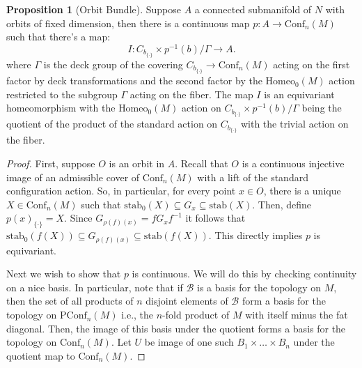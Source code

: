 \documentclass[10pt, oneside]{article}
\newcommand{\homeo}[1][S^1]{\text{Homeo}_0(#1)}
\newcommand{\conf}[2][S^1]{\text{Conf}_{#2}(#1)}
\newcommand{\pconf}[2][S^1]{\text{PConf}_{#2}(#1)}
\newcommand{\set}{{\{\cdot\}}}
\theoremstyle{definition}
\newtheorem{prop}{Proposition}[section]
\theoremstyle{definition}
\begin{document}
\begin{prop}[Orbit Bundle]
    Suppose $A$ a connected submanifold of $N$ 
    with orbits of fixed dimension, 
    then there is a continuous map $p: A\to \conf[M]{n}$ 
    such that there's a map: $$I: C_{b_\set} \times p^{-1}(b)/ \Gamma \to A.$$
    where $\Gamma$ is the deck group of the covering $C_{b_\set} \to \conf[M]{n}$ 
    acting on the first factor by deck transformations 
    and the second factor by the $\homeo[M]$ action 
    restricted to the subgroup $\Gamma$ acting on the fiber.
    The map $I$ is an equivariant homeomorphism 
    with the $\homeo[M]$ action on $C_{b_\set} \times p^{-1}(b) / \Gamma$ being the quotient of the product of the standard action on $C_{b_\set}$ 
    with the trivial action on the fiber.
\end{prop}
\begin{proof}
    First, 
    suppose $O$ is an orbit in $A$. 
    Recall that $O$ is a continuous injective image 
    of an admissible cover of $\conf[M]{n}$ 
    with a lift of the standard configuration action. 
    So, in particular, 
    for every point $x\in O$, 
    there is a unique $X\in\conf[M]{n}$ 
    such that $\text{stab}_0(X) \subseteq G_x \subseteq \text{stab}(X)$. 
    Then, define $p(x)_\set = X$. 
    Since $G_{\rho(f)(x)} = f G_x f^{-1}$ 
    it follows that $\text{stab}_0(f(X)) \subseteq G_{\rho(f)(x)}\subseteq \text{stab}(f(X))$. 
    This directly implies $p$ is equivariant. 

    Next we wish to show that $p$ is continuous.
    We will do this by checking continuity on a nice basis. 
    In particular, 
    note that if $\mathscr{B}$ is a basis for the topology on $M$, 
    then the set of all products of $n$ disjoint elements of $\mathscr{B}$ form a basis for the topology on $\pconf[M]{n}$ 
    i.e., the $n$-fold product of $M$ with itself minus the fat diagonal. 
    Then, the image of this basis under the quotient forms a basis for the topology on $\conf[M]{n}$.
    Let $U$ be image of one such $B_1\times\dots\times B_n$ 
    under the quotient map to $\conf[M]{n}$. 


\end{proof}
\end{document}
